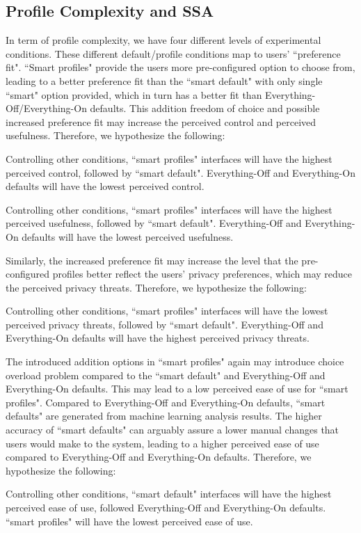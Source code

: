 \subsection{Profile Complexity and SSA}
In term of profile complexity, we have four different levels of experimental conditions. These different default/profile conditions map to users' ``preference fit". ``Smart profiles" provide the users more pre-configured option to choose from, leading to a better preference fit than the ``smart default" with only single ``smart" option provided, which in turn has a better fit than Everything-Off/Everything-On defaults. This addition freedom of choice and possible increased preference fit may increase the perceived control and perceived usefulness. Therefore, we hypothesize the following:
\theoremgroup
\begin{theorem}
	Controlling other conditions, ``smart profiles" interfaces will have the highest perceived control, followed by ``smart default". Everything-Off and Everything-On defaults will have the lowest perceived control.
\end{theorem}
\begin{theorem}
	Controlling other conditions, ``smart profiles" interfaces will have the highest perceived usefulness, followed by ``smart default". Everything-Off and Everything-On defaults will have the lowest perceived usefulness.
\end{theorem}

Similarly, the increased preference fit may increase the level that the pre-configured profiles better reflect the users' privacy preferences, which may reduce the perceived privacy threats. Therefore, we hypothesize the following:
\begin{theorem}
	Controlling other conditions, ``smart profiles" interfaces will have the lowest perceived privacy threats, followed by ``smart default". Everything-Off and Everything-On defaults will have the highest perceived privacy threats.
\end{theorem}

The introduced addition options in ``smart profiles" again may introduce choice overload problem compared to the ``smart default" and Everything-Off and Everything-On defaults. This may lead to a low perceived ease of use for ``smart profiles". Compared to Everything-Off and Everything-On defaults, ``smart defaults" are generated from machine learning analysis results. The higher accuracy of ``smart defaults" can arguably assure a lower manual changes that users would make to the system, leading to a higher perceived ease of use compared to Everything-Off and Everything-On defaults. Therefore, we hypothesize the following:
\begin{theorem}
	Controlling other conditions, ``smart default" interfaces will have the highest perceived ease of use, followed Everything-Off and Everything-On defaults. ``smart profiles" will have the lowest perceived ease of use.
\end{theorem}

